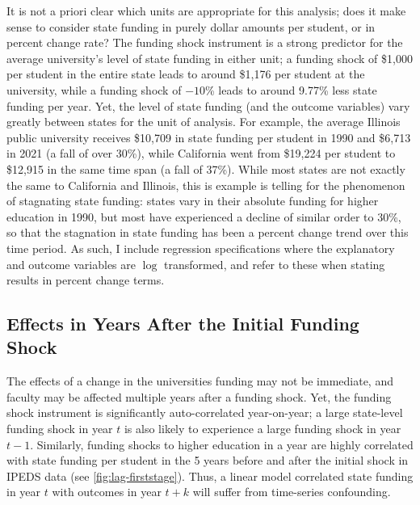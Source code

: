 It is not a priori clear which units are appropriate for this analysis;
does it make sense to consider state funding in purely dollar amounts per student, or in percent change rate?
The funding shock instrument is a strong predictor for the average university's level of state funding in either unit; a funding shock of \$1,000 per student in the entire state leads to around \$1,176 per student at the university, while a funding shock of $-10$\% leads to around 9.77\% less state funding per year.
Yet, the level of state funding (and the outcome variables) vary greatly between states for the unit of analysis.
For example, the average Illinois public university receives \$10,709 in state funding per student in 1990 and  \$6,713 in 2021 (a fall of over 30\%), while California went from \$19,224 per student to \$12,915 in the same time span (a fall of 37\%).
While most states are not exactly the same to California and Illinois, this is example is telling for the phenomenon of stagnating state funding:
states vary in their absolute funding for higher education in 1990, but most have experienced a decline of similar order to 30\%, so that the stagnation in state funding has been a percent change trend over this time period.
As such, I include regression specifications where the explanatory and outcome variables are $\log$ transformed, and refer to these when stating results in percent change terms.

\subsection{Effects in Years After the Initial Funding Shock}
\label{sec:local-projections}
The effects of a change in the universities funding may not be immediate, and faculty may be affected multiple years after a funding shock.
Yet, the funding shock instrument is significantly auto-correlated year-on-year; a large state-level funding shock in year $t$ is also likely to experience a large funding shock in year $t-1$.
Similarly, funding shocks to higher education in a year are highly correlated with state funding per student in the 5 years before and after the initial shock in IPEDS data (see \autoref{fig:lag-firststage}).
Thus, a linear model correlated state funding in year $t$ with outcomes in year $t+k$ will suffer from time-series confounding.

